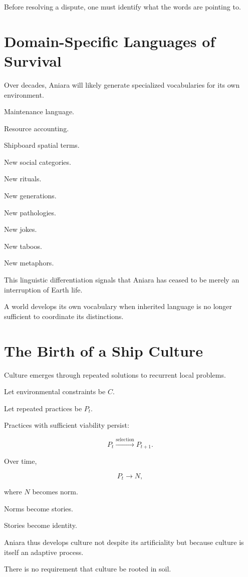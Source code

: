 \documentclass[11pt,oneside]{book}
\theoremstyle{definition}
\theoremstyle{remark}
\begin{document}
Before resolving a dispute, one must identify what the words are pointing to.

\section{Domain-Specific Languages of Survival}

Over decades, Aniara will likely generate specialized vocabularies for its own environment.

Maintenance language.

Resource accounting.

Shipboard spatial terms.

New social categories.

New rituals.

New generations.

New pathologies.

New jokes.

New taboos.

New metaphors.

This linguistic differentiation signals that Aniara has ceased to be merely an interruption of Earth life.

A world develops its own vocabulary when inherited language is no longer sufficient to coordinate its distinctions.

\section{The Birth of a Ship Culture}

Culture emerges through repeated solutions to recurrent local problems.

Let environmental constraints be \(C\).

Let repeated practices be \(P_t\).

Practices with sufficient viability persist:

\[
P_t
\xrightarrow{\text{selection}}
P_{t+1}.
\]

Over time,

\[
P_t\rightarrow N,
\]

where \(N\) becomes norm.

Norms become stories.

Stories become identity.

Aniara thus develops culture not despite its artificiality but because culture is itself an adaptive process.

There is no requirement that culture be rooted in soil.
\end{document}
